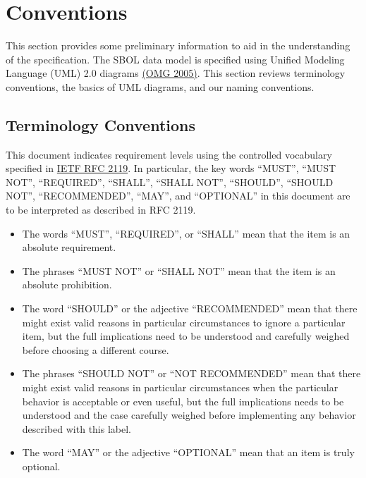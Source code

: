 \section{Conventions}

This section provides some preliminary information to aid in the understanding of the specification.
The SBOL data model is specified using Unified Modeling Language (UML) 2.0 diagrams \href{http://www.omg.org/spec/UML/2.0/}{(OMG 2005)}. This section reviews terminology conventions, the basics of UML diagrams, and our naming conventions.

\subsection{Terminology Conventions}

This document indicates requirement levels using the controlled vocabulary specified in \href{https://tools.ietf.org/html/rfc2119}{IETF RFC 2119}.
In particular, the key words ``MUST'', ``MUST NOT'', ``REQUIRED'', ``SHALL'', ``SHALL NOT'', ``SHOULD'', ``SHOULD NOT'', ``RECOMMENDED'', ``MAY'', and ``OPTIONAL'' in this document are to be interpreted as described in RFC 2119.

\begin{itemize}
\item The words ``MUST'', ``REQUIRED'', or ``SHALL'' mean that the item is an absolute requirement.
\item The phrases ``MUST NOT'' or ``SHALL NOT'' mean that the item is an absolute prohibition.
\item The word ``SHOULD'' or the adjective ``RECOMMENDED'' mean that there might exist valid reasons in particular circumstances to ignore a particular item, but the full implications need to be understood and carefully weighed before choosing a different course.
\item The phrases ``SHOULD NOT'' or ``NOT RECOMMENDED'' mean that there might exist valid reasons in particular circumstances when the particular behavior is acceptable or even useful, but the full implications needs to be understood and the case carefully weighed before implementing any behavior described with this label.
\item The word ``MAY'' or the adjective ``OPTIONAL'' mean that an item is truly optional.
\end{itemize}

